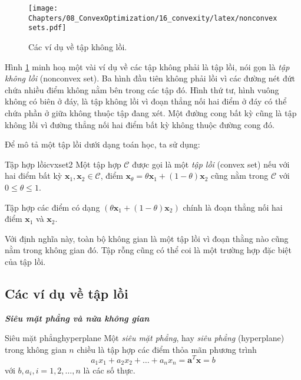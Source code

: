  

\begin{figure}[t]
\centering
    \texttt{[image: Chapters/08\_ConvexOptimization/16\_convexity/latex/nonconvexsets.pdf]}
    \caption[]{Các ví dụ về tập không lồi.}
    \label{fig:16_nonconvexsets}
\end{figure}

Hình \ref{fig:16_nonconvexsets} minh hoạ một vài ví dụ về các tập không phải là
tập lồi, nói gọn là \textit{tập không lồi} ({nonconvex set}). Ba hình đầu
tiên không phải lồi vì các đường nét đứt chứa nhiều điểm không nằm bên trong các
tập đó. Hình thứ tư, hình vuông không có biên ở đáy, là tập không lồi vì đoạn thẳng nối hai điểm ở đáy có thể chứa phần ở giữa không
thuộc tập đang xét. Một đường cong
bất kỳ cũng là tập không lồi vì đường thẳng nối hai điểm
bất kỳ không thuộc đường cong đó.
 
Để mô tả một {tập lồi} dưới dạng toán học, ta sử dụng:

\begin{mydef}{Tập hợp lồi}{cvxset2}
Một tập hợp $\mathcal{C}$ được gọi là một {\textit{tập lồi}} (convex set) nếu với hai điểm bất
kỳ $\mathbf{x}_1, \mathbf{x}_2 \in \mathcal{C}$, điểm $ \mathbf{x}_{\theta} =
\theta \mathbf{x}_1 + (1 - \theta) \mathbf{x}_2$ cũng nằm trong $\mathcal{C}$
với $0 \leq \theta \leq 1$.
\end{mydef}

Tập hợp các điểm có dạng $\left(\theta \mathbf{x}_1 + (1 -
\theta) \mathbf{x}_2\right)$ chính là {đoạn thẳng} nối hai điểm
$\mathbf{x}_1$ và $\mathbf{x}_2$.
 
Với định nghĩa này, {toàn bộ không gian} là một {tập lồi}
vì đoạn thằng nào cũng nằm trong không gian đó. Tập rỗng cũng có thể coi là một
trường hợp đặc biệt của {tập lồi}.
 
\subsection{Các ví dụ về tập lồi}

\textit{\textbf{{Siêu mặt phẳng} và {nửa không gian}}}
\begin{mydef}{Siêu mặt phẳng}{hyperplane}
Một \textit{siêu mặt phẳng}, hay \textit{siêu phẳng} ({hyperplane}) trong
không gian $n$ chiều là tập hợp các điểm thỏa mãn phương trình
\begin{equation} 
a_1 x_1 + a_2 x_2 + \dots + a_n x_n = \mathbf{a}^T\mathbf{x} = b 
\end{equation} 
với $b, a_i, i = 1, 2, \dots, n$ là các số thực. 
\end{mydef}
 
